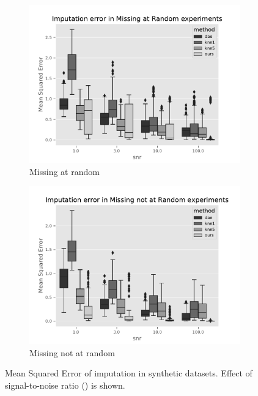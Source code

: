 \begin{figure}[htb]
\centering
\begin{subfigure}{.49\textwidth}
	\centering
        \includegraphics[width=\textwidth]{./tex/fig/mar_imput_err_boxplot.pdf}
        \caption{Missing at random}
        \label{fig:synthetic_benchmark_mar_box}
\end{subfigure}%
\hfill
\begin{subfigure}{.49\textwidth}
	\centering
        \includegraphics[width=\textwidth]{./tex/fig/mnar_imput_err_boxplot.pdf}
        \caption{Missing not at random}
        \label{fig:synthetic_benchmark_mnar_box}
\end{subfigure}
\caption{
Mean Squared Error of imputation in synthetic datasets. Effect of signal-to-noise ratio (\snr) is shown.
}
\label{fig:synthetic_benchmark_box}
\end{figure}

